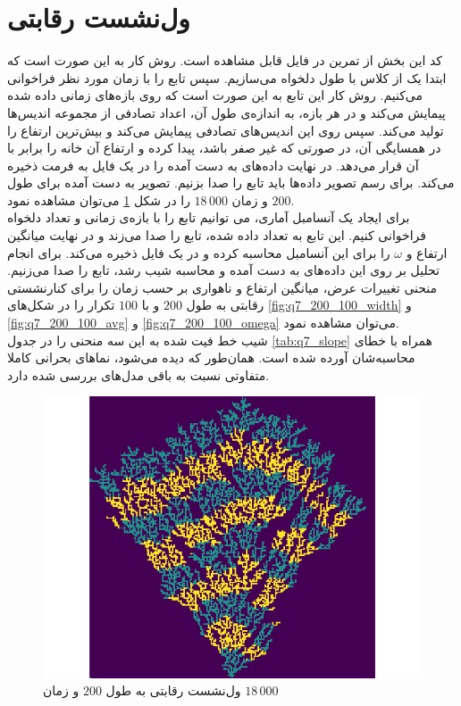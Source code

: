 \documentclass[11pt, a4paper]{article}
\begin{document}
\section{\textbf{ول‌نشست رقابتی}}
کد این بخش از تمرین در فایل
قابل مشاهده است. روش کار به این صورت است که ابتدا یک
از کلاس
با طول دلخواه می‌سازیم. سپس تابع
را با زمان مورد نظر فراخوانی می‌کنیم. روش کار این تابع به این صورت است که روی بازه‌های زمانی داده شده
پیمایش می‌کند و در هر بازه، به اندازه‌ی طول آن، اعداد تصادفی از مجموعه اندیس‌ها تولید می‌کند. 
سپس روی این اندیس‌های تصادفی پیمایش می‌کند و بیش‌ترین ارتفاع را در همسایگی آن، در صورتی که غیر صفر باشد، پیدا کرده و ارتفاع آن خانه را برابر با آن قرار می‌دهد.
در نهایت داده‌های به دست آمده را در یک فایل به فرمت
ذخیره می‌کند.
برای رسم تصویر داده‌ها باید تابع
را صدا بزنیم.
تصویر به دست آمده برای طول
$200$
و زمان
$18\,000$
را در شکل
\ref{fig:q7_200_18000}
می‌توان مشاهده نمود.
\\
برای ایجاد یک آنسامبل آماری، می توانیم تابع
را با بازه‌ی زمانی و تعداد دلخواه فراخوانی کنیم. 
این تابع به تعداد داده شده، تابع
را صدا می‌زند و در نهایت میانگین ارتفاع و 
$\omega$
را برای این آنسامبل محاسبه کرده و در یک فایل ذخیره می‌کند.
برای انجام تحلیل بر روی این داده‌های به دست آمده و محاسبه شیب رشد، تابع
را صدا می‌زنیم.
منحنی تغییرات عرض، میانگین ارتفاع و ناهواری بر حسب زمان را برای کنارنشستی رقابتی به طول
$200$
و با
$100$
تکرار را در شکل‌های
\ref{fig:q7_200_100_width}
و
\ref{fig:q7_200_100_avg}
و
\ref{fig:q7_200_100_omega}
می‌توان مشاهده نمود.
\\
شیب خط فیت شده به این سه منحنی را در جدول
\ref{tab:q7_slope}
همراه با خطا‌ی محاسبه‌شان آورده شده است.
همان‌طور که دیده می‌شود، نماهای بحرانی کاملا متفاوتی نسبت به باقی مدل‌های بررسی شده دارد.

\begin{figure}[h]
  \centering
  \includegraphics[width=.5\textwidth]{q7_200_18000.png}
  \caption{ول‌نشست رقابتی به طول $200$ و زمان $18\,000$}
  \label{fig:q7_200_18000}
\end{figure}
\end{document}
